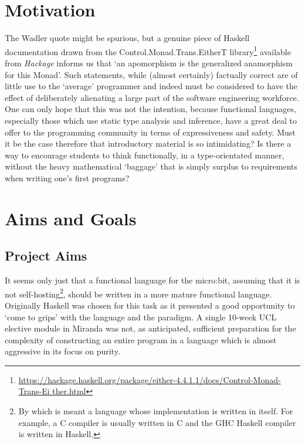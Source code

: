 \documentclass[12pt, a4paper]{report}
\begin{document}
\section{Motivation} 
The Wadler quote might be spurious, but a genuine piece of
Haskell documentation drawn from the Control.Monad.Trans.EitherT
library\footnote{\url{https://hackage.haskell.org/package/either-4.4.1.1/docs/Control-Monad-Trans-Ei
ther.html}} available from \textit{Hackage} informs us that `an apomorphism is the generalized
anamorphism for this Monad'. Such statements, while (almost certainly) factually correct are
of little use to the `average' programmer and indeed must be considered to have the effect of
deliberately alienating a large part of the software engineering workforce. One can only hope
that this was not the intention, because functional languages, especially those which use static
type analysis and inference, have a great deal to offer to the programming community in terms
of expressiveness and safety. Must it be the case therefore that introductory material is so
intimidating? Is there a way to encourage students to think functionally, in a type-orientated
manner, without the heavy mathematical `baggage' that is simply surplus to requirements when writing
one's first programs?

\section{Aims and Goals}
\subsection{Project Aims}
It seems only just that a functional language for the micro:bit, assuming that it is not
self-hosting\footnote{By which is meant a language whose implementation is written in itself. For
example, a C compiler is usually written in C and the GHC Haskell compiler is written in Haskell.},
should be written in a more mature functional language. Originally Haskell was chosen for this task as it
presented a good opportunity to `come to grips' with the language and the paradigm. A single 10-week
UCL elective module in Miranda was not, as anticipated, sufficient preparation for the complexity of
constructing an entire program in a language which is almost aggressive in its focus on purity.
\end{document}
